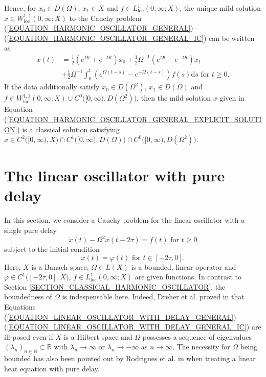 \documentclass[12pt]{article}
\numberwithin{equation}{section}
\numberwithin{equation}{section}
\begin{document}
	Hence, for $x_{0} \in D(\Omega)$, $x_{1} \in X$ and $f \in L^{1}_{\mathrm{loc}}(0, \infty; X)$,
	the unique mild solution $x \in W^{1, 1}_{\mathrm{loc}}(0, \infty; X)$
	to the Cauchy problem (\ref{EQUATION_HARMONIC_OSCILLATOR_GENERAL})--(\ref{EQUATION_HARMONIC_OSCILLATOR_GENERAL_IC}) 
	can be written as
	\begin{equation}
		\begin{split}
			x(t) &= \tfrac{1}{2} (e^{\Omega t} + e^{-\Omega t}) x_{0} +
			\tfrac{1}{2} \Omega^{-1} (e^{\Omega t} - e^{-\Omega t}) x_{1} \\
			&+ \tfrac{1}{2} \Omega^{-1} \int_{0}^{t} (e^{\Omega (t - s)} - e^{-\Omega (t - s)}) f(s) \mathrm{d}s
			\text{ for } t \geq 0.
		\end{split}
		\label{EQUATION_HARMONIC_OSCILLATOR_GENERAL_EXPLICIT_SOLUTION}
	\end{equation}
	If the data additionally satisfy $x_{0} \in D(\Omega^{2})$, $x_{1} \in D(\Omega)$ and 
	$f \in W^{1, 1}_{\mathrm{loc}}(0, \infty; X) \cup C^{0}\big([0, \infty), D(\Omega^{2})\big)$,
	then the mild solution $x$ given in Equation (\ref{EQUATION_HARMONIC_OSCILLATOR_GENERAL_EXPLICIT_SOLUTION})
	is a classical solution satisfying
	$x \in C^{2}\big([0, \infty), X\big) \cap C^{1}\big([0, \infty), D(\Omega)\big) \cap C^{0}\big([0, \infty), D(\Omega^{2})\big)$.

\section{The linear oscillator with pure delay}
	\label{SECTION_CLASSICAL_HARMONIC_OSCILLATOR_WITH_PURE_DELAY}
	In this section, we consider a Cauchy problem for the linear oscillator with a single pure delay
	\begin{equation}
		\ddot{x}(t) - \Omega^{2} x(t - 2\tau) = f(t) \text{ for } t \geq 0
		\label{EQUATION_LINEAR_OSCILLATOR_WITH_DELAY_GENERAL}
	\end{equation}
	subject to the initial condition
	\begin{equation}
		x(t) = \varphi(t) \text{ for } t \in [-2\tau, 0].
		\label{EQUATION_LINEAR_OSCILLATOR_WITH_DELAY_GENERAL_IC}
	\end{equation}
	Here, $X$ is a Banach space, $\Omega \in L(X)$ is a bounded, linear operator and 
	$\varphi \in C^{1}\big([-2\tau, 0], X\big)$, $f \in L^{1}_{\mathrm{loc}}(0, \infty; X)$ are given functions.
	In contrast to Section \ref{SECTION_CLASSICAL_HARMONIC_OSCILLATOR},
	the boundedness of $\Omega$ is indespensable here.
	Indeed, Dreher et al. proved in \cite{DreQuiRa2009}
	that Equations (\ref{EQUATION_LINEAR_OSCILLATOR_WITH_DELAY_GENERAL})--(\ref{EQUATION_LINEAR_OSCILLATOR_WITH_DELAY_GENERAL_IC})
	are ill-posed even if $X$ is a Hilbert space and $\Omega$ possesses a sequence of eigenvalues $(\lambda_{n})_{n \in \mathbb{N}} \subset \mathbb{R}$
	with $\lambda_{n} \to \infty$ or $\lambda_{n} \to -\infty$ as $n \to \infty$.
	The necessity for $\Omega$ being bounded has also been pointed out by Rodrigues et al. in \cite{RoWu2007}
	when treating a linear heat equation with pure delay.
\end{document}
